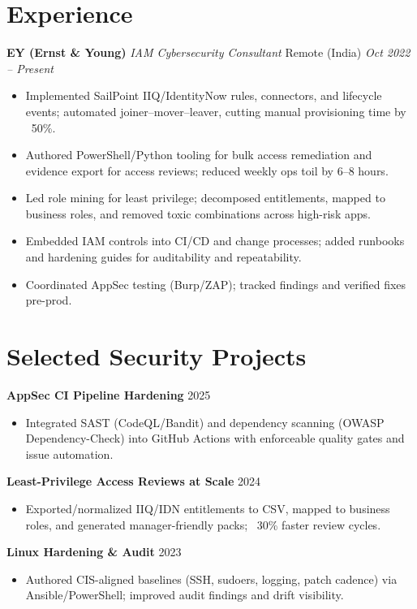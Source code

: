 \documentclass[11pt]{article}
\newcommand{\location}[1]{\hfill {\small #1}}
\newcommand{\daterange}[1]{\hfill {\small #1}}
\begin{document}
\section*{Experience}
\textbf{EY (Ernst \& Young)} \emph{IAM Cybersecurity Consultant} \location{Remote (India)} \daterange{\textit{Oct 2022 -- Present}}\\
\begin{itemize}
  \item Implemented SailPoint IIQ/IdentityNow rules, connectors, and lifecycle events; automated joiner--mover--leaver, cutting manual provisioning time by ~50\%.
  \item Authored PowerShell/Python tooling for bulk access remediation and evidence export for access reviews; reduced weekly ops toil by 6--8 hours.
  \item Led role mining for least privilege; decomposed entitlements, mapped to business roles, and removed toxic combinations across high-risk apps.
  \item Embedded IAM controls into CI/CD and change processes; added runbooks and hardening guides for auditability and repeatability.
  \item Coordinated AppSec testing (Burp/ZAP); tracked findings and verified fixes pre-prod.
\end{itemize}

\section*{Selected Security Projects}
\textbf{AppSec CI Pipeline Hardening} \daterange{2025}\\
\begin{itemize}
  \item Integrated SAST (CodeQL/Bandit) and dependency scanning (OWASP Dependency-Check) into GitHub Actions with enforceable quality gates and issue automation.
\end{itemize}
\textbf{Least-Privilege Access Reviews at Scale} \daterange{2024}\\
\begin{itemize}
  \item Exported/normalized IIQ/IDN entitlements to CSV, mapped to business roles, and generated manager-friendly packs; ~30\% faster review cycles.
\end{itemize}
\textbf{Linux Hardening \& Audit} \daterange{2023}\\
\begin{itemize}
  \item Authored CIS-aligned baselines (SSH, sudoers, logging, patch cadence) via Ansible/PowerShell; improved audit findings and drift visibility.
\end{itemize}
\end{document}

